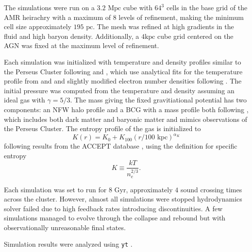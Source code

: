\documentclass[iop,apjl, twocolappendix]{emulateapj}   %
\begin{document}
The simulations were run on a $3.2 \text{ Mpc}$ cube with $64^3$ cells in the
base grid of the AMR heirachry with a maximum of $8$ levels of refinement,
making the minimum cell size approximately $195 \text{ pc}$. The mesh was
refined at high gradients in the fluid and high baryon density. Additionally, a $4 \text{
  kpc}$ cube grid centered on the AGN was fixed at the maximum level of
refinement.

Each simulation was initialized with temperature and density profiles similar
to the Perseus Cluster following \citep{li_simulating_2012} and
\citep{meece_triggering_2017}, which use analytical fits for the temperature
profile from \citep{churazov_xmm-newton_2004} and
\citep{vikhlinin_chandra_2006} and slightly modified electron number densities
following \citep{mathews_heating_2006}. The initial pressure was computed from
the temperature and density assuming an ideal gas with $\gamma=5/3$. The mass
giving the fixed gravitiational potential has two components: an NFW halo
profile and a BCG with a mass profile both following
\citep{li_simulating_2012}, which includes both dark matter and baryonic matter
and mimics observations of the Perseus Cluster. The entropy profile of the gas
is initialized to 
\begin{equation}
  K(r) = K_{0} + K_{100} \left ( r/ 100 \text{ kpc} \right )^{\alpha_K}
\end{equation}
following results from the ACCEPT database \citep{cavagnolo_intracluster_2009}, using the definition for specific entropy
\begin{equation}
  K \equiv \frac{ kT}{n_e^{2/3} }.
\end{equation}

Each simulation was set to run for $8 \text{ Gyr}$, approximately $4$ sound
crossing times across the cluster.  However, almost all simulations were
stopped hydrodynamics solver failed due to high feedback rates introducing
discontinuities. A few simulations managed to evolve through the collapse and
rebound but with observationally unreasonable final states. 

Simulation results were analyzed using \texttt{yt} \cite{turk_yt_2011}.
\end{document}
